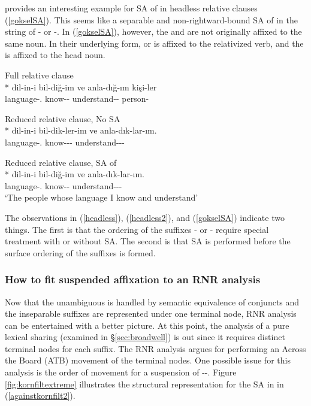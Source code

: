\citet{goksel2005morphology} provides an interesting example for SA of {\Pl} in headless relative clauses (\ref{gokselSA}). This seems like a separable and non-rightward-bound SA of {\Pl} in the string of {\Pl-\Poss} or {\Pl-\Agr}. In (\ref{gokselSA}), however, the {\Pl} and {\Poss} are not originally affixed to the same noun. In their underlying form, {\Poss} or {\Agr} is affixed to the relativized verb, and the {\Pl} is affixed to the head noun.


\begin{exe}
    \ex \label{gokselSA}
    \begin{xlist}
    \ex Full relative clause\\*
    \gll dil-in-i bil-diğ-im ve anla-dığ-ım kişi-ler \\
    language-{\Poss.\Spl} know-{\Pp}-{\Fsg} {\And} understand-{\Pp}-{\Fsg} person-{\Pl} \\
    \glt ${}$
    
    \ex Reduced relative clause, No SA \\*
    \gll dil-in-i bil-dik-ler-im ve anla-dık-lar-ım. \\
    language-{\Poss.\Spl} know-{\Pp}-{\Pl}-{\Fsg} {\And} understand-{\Pp}-{\Pl}-{\Fsg} \\
    \glt ${}$
    
    \ex Reduced relative clause, SA of {\Pl}\\*
    \gll dil-in-i bil-diğ-im ve anla-dık-lar-ım. \\
    language-{\Poss.\Spl} know-{\Pp}-{\Fsg} {\And} understand-{\Pp}-{\Pl}-{\Fsg} \\
    \glt `The people whose language I know and understand'
    \end{xlist}
\end{exe}

The observations in (\ref{headless}), (\ref{headless2}), and (\ref{gokselSA}) indicate two things. The first is that the ordering of the suffixes {\Pl-\Poss} or {\Pl-\Agr} require special treatment with or without SA. The second is that SA is performed before the surface ordering of the suffixes is formed.

\subsubsection{How to fit suspended affixation to an RNR analysis}

Now that the unambiguous {\Case} is handled by semantic equivalence of conjuncts and the inseparable suffixes are represented under one terminal node, RNR analysis can be entertained with a better picture. At this point, the analysis of a pure lexical sharing \citep{broadwell2008turkish} (examined in \S\ref{sec:broadwell}) is out since it requires distinct terminal nodes for each suffix. The RNR analysis argues for performing an Across the Board (ATB) movement of the terminal nodes. One possible issue for this analysis is the order of movement for a suspension of {\Pl-\Poss-\Case}. Figure \ref{fig:kornfiltextreme} illustrates the structural representation for the SA in in (\ref{againstkornfilt2}).

